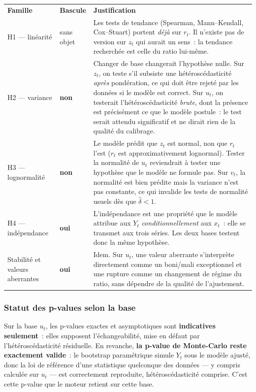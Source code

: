 \documentclass[a4paper,11pt]{article}
\begin{document}
\begin{center}
\small
{}
\begin{tabular}{@{}p{2.5cm}p{1.9cm}p{10.4cm}@{}}
\rowcolor{tableheader}
\textcolor{financeblue}{\textbf{Famille}} &
\textcolor{financeblue}{\textbf{Bascule}} &
\textcolor{financeblue}{\textbf{Justification}} \\
H1 --- linéarité & sans objet &
Les tests de tendance (Spearman, Mann--Kendall, Cox--Stuart) portent \emph{déjà}
sur $r_t$. Il n'existe pas de version sur $z_t$ qui aurait un sens~: la tendance
recherchée est celle du ratio lui-même. \\
H2 --- variance & \textbf{non} &
Changer de base changerait l'hypothèse nulle. Sur $z_t$, on teste s'il subsiste
une hétéroscédasticité \emph{après} pondération, ce qui doit être rejeté par les
données si le modèle est correct. Sur $u_t$, on testerait l'hétéroscédasticité
\emph{brute}, dont la présence est précisément ce que le modèle postule~: le
test serait attendu significatif et ne dirait rien de la qualité du calibrage. \\
H3 --- lognormalité & \textbf{non} &
Le modèle prédit que $z_t$ est normal, non que $r_t$ l'est ($r_t$ est
approximativement lognormal). Tester la normalité de $u_t$ reviendrait à tester
une hypothèse que le modèle ne formule pas. Sur $v_t$, la normalité est bien
prédite mais la variance n'est pas constante, ce qui invalide les tests de
normalité usuels dès que $\hat\delta < 1$. \\
H4 --- indépendance & \textbf{oui} &
L'indépendance est une propriété que le modèle attribue aux $Y_t$
\emph{conditionnellement} aux $x_t$~: elle se transmet aux trois séries. Les
deux bases testent donc la même hypothèse. \\
Stabilité et valeurs aberrantes & \textbf{oui} &
Idem. Sur $u_t$, une valeur aberrante s'interprète directement comme un
boni/mali exceptionnel et une rupture comme un changement de régime du ratio,
sans dépendre de la qualité de l'ajustement. \\
\end{tabular}
\end{center}

\subsubsection*{Statut des p-values selon la base}

Sur la base $u_t$, les p-values exactes et asymptotiques sont \textbf{indicatives
seulement}~: elles supposent l'échangeabilité, mise en défaut par
l'hétéroscédasticité résiduelle. En revanche, \textbf{la p-value de Monte-Carlo
reste exactement valide}~: le bootstrap paramétrique simule $Y_t$ sous le modèle
ajusté, donc la loi de référence d'une statistique quelconque des données --- y
compris calculée sur $u_t$ --- est correctement reproduite, hétéroscédasticité
comprise. C'est cette p-value que le moteur retient sur cette base.
\end{document}
